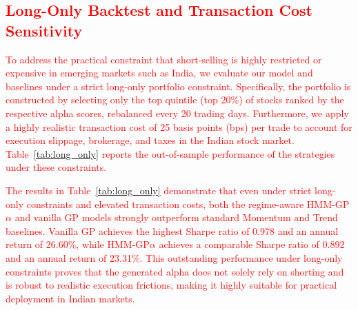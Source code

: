 \documentclass{ieeeaccess}
\newcommand{\revised}[1]{\textcolor{red}{#1}}
\begin{document}
\subsection{\revised{Long-Only Backtest and Transaction Cost Sensitivity}}
\label{sec:long_only}
\revised{To address the practical constraint that short-selling is highly restricted or expensive in emerging markets such as India, we evaluate our model and baselines under a strict long-only portfolio constraint. Specifically, the portfolio is constructed by selecting only the top quintile (top 20\%) of stocks ranked by the respective alpha scores, rebalanced every 20 trading days. Furthermore, we apply a highly realistic transaction cost of 25 basis points (bps) per trade to account for execution slippage, brokerage, and taxes in the Indian stock market. Table~\ref{tab:long_only} reports the out-of-sample performance of the strategies under these constraints.}

\begin{table}[!htbp]
\centering
\caption{\revised{Out-of-Sample Performance under Long-Only Constraints (25 bps Transaction Cost).}}
\label{tab:long_only}
{\color{red} %
}
\end{table}

\revised{The results in Table~\ref{tab:long_only} demonstrate that even under strict long-only constraints and elevated transaction costs, both the regime-aware HMM-GP$\alpha$ and vanilla GP models strongly outperform standard Momentum and Trend baselines. Vanilla GP achieves the highest Sharpe ratio of 0.978 and an annual return of 26.60\%, while HMM-GP$\alpha$ achieves a comparable Sharpe ratio of 0.892 and an annual return of 23.31\%. This outstanding performance under long-only constraints proves that the generated alpha does not solely rely on shorting and is robust to realistic execution frictions, making it highly suitable for practical deployment in Indian markets.}
\end{document}
